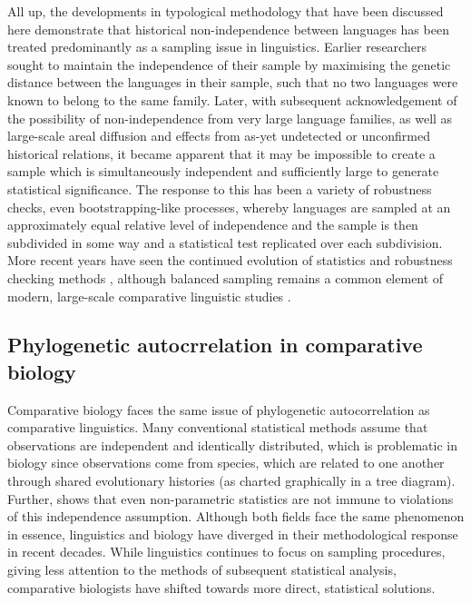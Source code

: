 All up, the developments in typological methodology that have been discussed here demonstrate that historical non-independence between languages has been treated predominantly as a sampling issue in linguistics. Earlier researchers sought to maintain the independence of their sample by maximising the genetic distance between the languages in their sample, such that no two languages were known to belong to the same family. Later, with subsequent acknowledgement of the possibility of non-independence from very large language families, as well as large-scale areal diffusion and effects from as-yet undetected or unconfirmed historical relations, it became apparent that it may be impossible to create a sample which is simultaneously independent and sufficiently large to generate statistical significance. The response to this has been a variety of robustness checks, even bootstrapping-like processes, whereby languages are sampled at an approximately equal relative level of independence and the sample is then subdivided in some way and a statistical test replicated over each subdivision. More recent years have seen the continued evolution of statistics and robustness checking methods \autocite[for an overview, see][]{roberts_robust_2018}, although balanced sampling remains a common element of modern, large-scale comparative linguistic studies \autocites[for example,][]{everett_climate_2015}{everett_languages_2017}{blasi_grammars_2017}.

\hypertarget{phylo-auto-bio}{%
\subsection{Phylogenetic autocrrelation in comparative biology}\label{phylo-auto-bio}}

Comparative biology faces the same issue of phylogenetic autocorrelation as comparative linguistics. Many conventional statistical methods assume that observations are independent and identically distributed, which is problematic in biology since observations come from species, which are related to one another through shared evolutionary histories (as charted graphically in a tree diagram). Further, \textcite[p.~4]{felsenstein_phylogenies_1985} shows that even non-parametric statistics are not immune to violations of this independence assumption. Although both fields face the same phenomenon in essence, linguistics and biology have diverged in their methodological response in recent decades. While linguistics continues to focus on sampling procedures, giving less attention to the methods of subsequent statistical analysis, comparative biologists have shifted towards more direct, statistical solutions.

